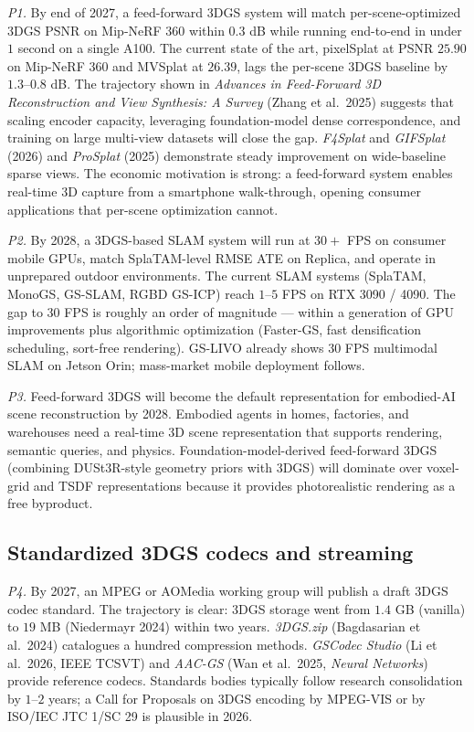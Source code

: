 \documentclass{article}
\begin{document}
\emph{P1.} By end of 2027, a feed-forward 3DGS system will match per-scene-optimized 3DGS PSNR on Mip-NeRF 360 within \(0.3\) dB while running end-to-end in under \(1\) second on a single A100. The current state of the art, pixelSplat at PSNR \(25.90\) on Mip-NeRF 360 and MVSplat at \(26.39\), lags the per-scene 3DGS baseline by \(1.3\)--\(0.8\) dB. The trajectory shown in \emph{Advances in Feed-Forward 3D Reconstruction and View Synthesis: A Survey} (Zhang et al.~2025) suggests that scaling encoder capacity, leveraging foundation-model dense correspondence, and training on large multi-view datasets will close the gap. \emph{F4Splat} and \emph{GIFSplat} (2026) and \emph{ProSplat} (2025) demonstrate steady improvement on wide-baseline sparse views. The economic motivation is strong: a feed-forward system enables real-time 3D capture from a smartphone walk-through, opening consumer applications that per-scene optimization cannot.

\emph{P2.} By 2028, a 3DGS-based SLAM system will run at \(30+\) FPS on consumer mobile GPUs, match SplaTAM-level RMSE ATE on Replica, and operate in unprepared outdoor environments. The current SLAM systems (SplaTAM, MonoGS, GS-SLAM, RGBD GS-ICP) reach \(1\)--\(5\) FPS on RTX 3090 / 4090. The gap to \(30\) FPS is roughly an order of magnitude --- within a generation of GPU improvements plus algorithmic optimization (Faster-GS, fast densification scheduling, sort-free rendering). GS-LIVO already shows \(30\) FPS multimodal SLAM on Jetson Orin; mass-market mobile deployment follows.

\emph{P3.} Feed-forward 3DGS will become the default representation for embodied-AI scene reconstruction by 2028. Embodied agents in homes, factories, and warehouses need a real-time 3D scene representation that supports rendering, semantic queries, and physics. Foundation-model-derived feed-forward 3DGS (combining DUSt3R-style geometry priors with 3DGS) will dominate over voxel-grid and TSDF representations because it provides photorealistic rendering as a free byproduct.

\subsection{Standardized 3DGS codecs and streaming}\label{standardized-3dgs-codecs-and-streaming}

\emph{P4.} By 2027, an MPEG or AOMedia working group will publish a draft 3DGS codec standard. The trajectory is clear: 3DGS storage went from \(1.4\) GB (vanilla) to \(19\) MB (Niedermayr 2024) within two years. \emph{3DGS.zip} (Bagdasarian et al.~2024) catalogues a hundred compression methods. \emph{GSCodec Studio} (Li et al.~2026, IEEE TCSVT) and \emph{AAC-GS} (Wan et al.~2025, \emph{Neural Networks}) provide reference codecs. Standards bodies typically follow research consolidation by \(1\)--\(2\) years; a Call for Proposals on 3DGS encoding by MPEG-VIS or by ISO/IEC JTC 1/SC 29 is plausible in 2026.
\end{document}
